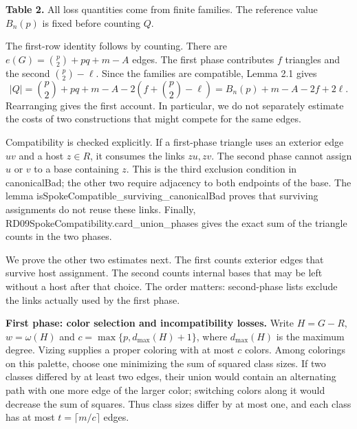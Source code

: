\documentclass[english,11pt,a4paper]{article}
\begin{document}
\textbf{Table 2.} All loss quantities come from finite families. The reference value \(B_n(p)\) is fixed before counting \(Q\).

The first-row identity follows by counting. There are \(e(G)=\binom p2+pq+m-A\) edges. The first phase contributes \(f\) triangles and the second \(\binom p2-\ell\). Since the families are compatible, Lemma 2.1 gives \[
|Q|=\binom p2+pq+m-A-2\left(f+\binom p2-\ell\right)
=B_n(p)+m-A-2f+2\ell.
\tag{5.4a}
\] Rearranging gives the first account. In particular, we do not separately estimate the costs of two constructions that might compete for the same edges.

Compatibility is checked explicitly. If a first-phase triangle uses an exterior edge \(uv\) and a host \(z\in R\), it consumes the links \(zu,zv\). The second phase cannot assign \(u\) or \(v\) to a base containing \(z\). This is the third exclusion condition in {\ttfamily\small canonicalBad}; the other two require adjacency to both endpoints of the base. The lemma {\ttfamily\small isSpokeCompa\discretionary{\hbox{\ensuremath{\hookrightarrow}}}{}{}tible\_\discretionary{\hbox{\ensuremath{\hookrightarrow}}}{}{}surviving\_\discretionary{\hbox{\ensuremath{\hookrightarrow}}}{}{}canonicalBad} proves that surviving assignments do not reuse these links. Finally, {\ttfamily\small RD09SpokeCom\discretionary{\hbox{\ensuremath{\hookrightarrow}}}{}{}patibility.\discretionary{\hbox{\ensuremath{\hookrightarrow}}}{}{}card\_\discretionary{\hbox{\ensuremath{\hookrightarrow}}}{}{}union\_\discretionary{\hbox{\ensuremath{\hookrightarrow}}}{}{}phases} gives the exact sum of the triangle counts in the two phases.

We prove the other two estimates next. The first counts exterior edges that survive host assignment. The second counts internal bases that may be left without a host after that choice. The order matters: second-phase lists exclude the links actually used by the first phase.

\textbf{First phase: color selection and incompatibility losses.} Write \(H=G-R\), \(w=\omega(H)\) and \(c=\max\{p,d_{\max}(H)+1\}\), where \(d_{\max}(H)\) is the maximum degree. Vizing supplies a proper coloring with at most \(c\) colors. Among colorings on this palette, choose one minimizing the sum of squared class sizes. If two classes differed by at least two edges, their union would contain an alternating path with one more edge of the larger color; switching colors along it would decrease the sum of squares. Thus class sizes differ by at most one, and each class has at most \(t=\lceil m/c\rceil\) edges.
\end{document}

